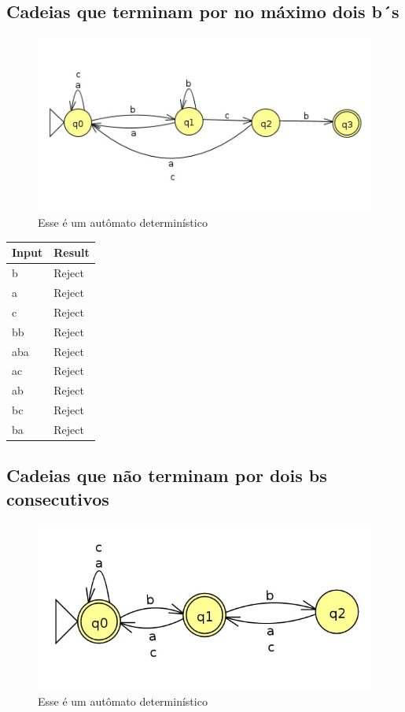 \documentclass[11pt]{article}
\begin{document}
\subsection{Cadeias que terminam por no máximo dois b´s}
\label{sec:org88e7b84}
\begin{figure}[htbp]
\centering
\includegraphics[width=.9\linewidth]{./q1/b/q1b.jpg}
\caption{\label{fig:org864d77e}
Esse é um autômato determinístico}
\end{figure}

\begin{center}
\begin{tabular}{ll}
Input & Result\\
\hline
b & Reject\\
a & Reject\\
c & Reject\\
bb & Reject\\
aba & Reject\\
ac & Reject\\
ab & Reject\\
bc & Reject\\
ba & Reject\\
\end{tabular}
\end{center}
\subsection{Cadeias que não terminam por dois bs consecutivos}
\label{sec:org246522a}
\begin{figure}[htbp]
\centering
\includegraphics[width=.9\linewidth]{./q1/c/q1c.jpg}
\caption{\label{fig:orga3a4648}
Esse é um autômato determinístico}
\end{figure}
\end{document}
